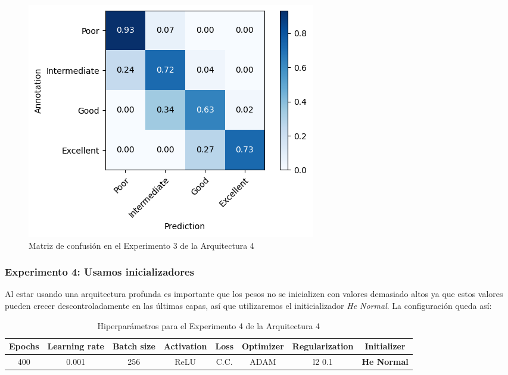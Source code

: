 \documentclass{article}
\begin{document}
			\begin{figure}[!h]
				\begin{center}
					\includegraphics[scale=0.5]{d-cm-a4-e3.png}		
					\caption{Matriz de confusi\'on en el Experimento 3 de la Arquitectura 4}	
					\label{d-cm-a4-e3}
				\end{center}
			\end{figure}
			
			
		\subsubsection{Experimento 4: Usamos inicializadores}
        \label{s-a4-e4}
			Al estar usando una arquitectura profunda es importante que los pesos no se inicializen con valores demasiado altos ya que estos valores pueden crecer descontroladamente en las \'ultimas capas, as\'i que utilizaremos el initicializador \textit{He Normal}. La configuraci\'on queda as\'i:
			
			\begin{table}[!h]
				\begin{tabular}{|c|c|c|c|c|c|c|c|}
					\textbf{Epochs}&\textbf{Learning rate}&\textbf{Batch size}&\textbf{Activation}&\textbf{Loss}&\textbf{Optimizer}&\textbf{Regularization}  & \textbf{Initializer} \\ \hline
					400 & 0.001 & 256 & ReLU & C.C. & ADAM & l2 0.1 & \textbf{He Normal}
				\end{tabular}
				\caption{Hiperpar\'ametros para el Experimento 4 de la Arquitectura 4}
				\label{tab:hip-d-a4-e4}
			\end{table}
            			
\end{document}
